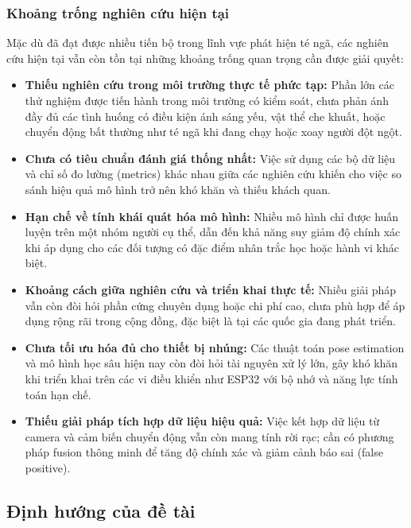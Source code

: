 \subsubsection{Khoảng trống nghiên cứu hiện tại}
Mặc dù đã đạt được nhiều tiến bộ trong lĩnh vực phát hiện té ngã, các nghiên cứu hiện tại vẫn còn tồn tại những khoảng trống quan trọng cần được giải quyết:
\begin{itemize}
    \item \textbf{Thiếu nghiên cứu trong môi trường thực tế phức tạp:} Phần lớn các thử nghiệm được tiến hành trong môi trường có kiểm soát, chưa phản ánh đầy đủ các tình huống có điều kiện ánh sáng yếu, vật thể che khuất, hoặc chuyển động bất thường như té ngã khi đang chạy hoặc xoay người đột ngột.
    
    \item \textbf{Chưa có tiêu chuẩn đánh giá thống nhất:} Việc sử dụng các bộ dữ liệu và chỉ số đo lường (metrics) khác nhau giữa các nghiên cứu khiến cho việc so sánh hiệu quả mô hình trở nên khó khăn và thiếu khách quan.

    \item \textbf{Hạn chế về tính khái quát hóa mô hình:} Nhiều mô hình chỉ được huấn luyện trên một nhóm người cụ thể, dẫn đến khả năng suy giảm độ chính xác khi áp dụng cho các đối tượng có đặc điểm nhân trắc học hoặc hành vi khác biệt.

    \item \textbf{Khoảng cách giữa nghiên cứu và triển khai thực tế:} Nhiều giải pháp vẫn còn đòi hỏi phần cứng chuyên dụng hoặc chi phí cao, chưa phù hợp để áp dụng rộng rãi trong cộng đồng, đặc biệt là tại các quốc gia đang phát triển.

    \item \textbf{Chưa tối ưu hóa đủ cho thiết bị nhúng:} Các thuật toán pose estimation và mô hình học sâu hiện nay còn đòi hỏi tài nguyên xử lý lớn, gây khó khăn khi triển khai trên các vi điều khiển như ESP32 với bộ nhớ và năng lực tính toán hạn chế.

    \item \textbf{Thiếu giải pháp tích hợp dữ liệu hiệu quả:} Việc kết hợp dữ liệu từ camera và cảm biến chuyển động vẫn còn mang tính rời rạc; cần có phương pháp fusion thông minh để tăng độ chính xác và giảm cảnh báo sai (false positive).
\end{itemize}


\subsection{Định hướng của đề tài \TENLUANVAN}


